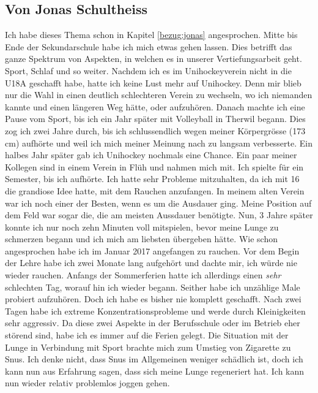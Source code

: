 \subsection{Von Jonas Schultheiss}
\authortoc{\jonas}{\subsectionident}
\label{vorher_jonas}
Ich habe dieses Thema schon in Kapitel \ref{bezug:jonas} angesprochen.
\newline
Mitte bis Ende der Sekundarschule habe ich mich etwas gehen lassen. Dies betrifft das ganze Spektrum von Aspekten, in welchen es in unserer Vertiefungsarbeit geht. Sport, Schlaf und so weiter. Nachdem ich es im Unihockeyverein nicht in die U18A geschafft habe, hatte ich keine Lust mehr auf Unihockey. Denn mir blieb nur die Wahl in einen deutlich schlechteren Verein zu wechseln, wo ich niemanden kannte und einen längeren Weg hätte, oder aufzuhören. Danach machte ich eine Pause vom Sport, bis ich ein Jahr später mit Volleyball in Therwil begann. Dies zog ich zwei Jahre durch, bis ich schlussendlich wegen meiner Körpergrösse (173 cm) aufhörte und weil ich mich meiner Meinung nach zu langsam verbesserte. Ein halbes Jahr später gab ich Unihockey nochmals eine Chance. Ein paar meiner Kollegen sind in einem Verein in Flüh und nahmen mich mit. Ich spielte für ein Semester, bis ich aufhörte. Ich hatte sehr Probleme mitzuhalten, da ich mit 16 die grandiose Idee hatte, mit dem Rauchen anzufangen. In meinem alten Verein war ich noch einer der Besten, wenn es um die Ausdauer ging. Meine Position auf dem Feld war sogar die, die am meisten Aussdauer benötigte. Nun, 3 Jahre später konnte ich nur noch zehn Minuten voll mitspielen, bevor meine Lunge zu schmerzen begann und ich mich am liebsten übergeben hätte.
\newline
Wie schon angesprochen habe ich im Januar 2017 angefangen zu rauchen. Vor dem Begin der Lehre habe ich zwei Monate lang aufgehört und dachte mir, ich würde nie wieder rauchen. Anfangs der Sommerferien hatte ich allerdings einen \textit{sehr} schlechten Tag, worauf hin ich wieder begann. Seither habe ich unzählige Male probiert aufzuhören. Doch ich habe es bisher nie komplett geschafft. Nach zwei Tagen habe ich extreme Konzentrationsprobleme und werde durch Kleinigkeiten sehr aggressiv. Da diese zwei Aspekte in der Berufsschule oder im Betrieb eher störend sind, habe ich es immer auf die Ferien gelegt. Die Situation mit der Lunge in Verbindung mit Sport brachte mich zum Umstieg von Zigarette zu Snus. Ich denke nicht, dass Snus im Allgemeinen weniger schädlich ist, doch ich kann nun aus Erfahrung sagen, dass sich meine Lunge regeneriert hat. Ich kann nun wieder relativ problemlos joggen gehen.
